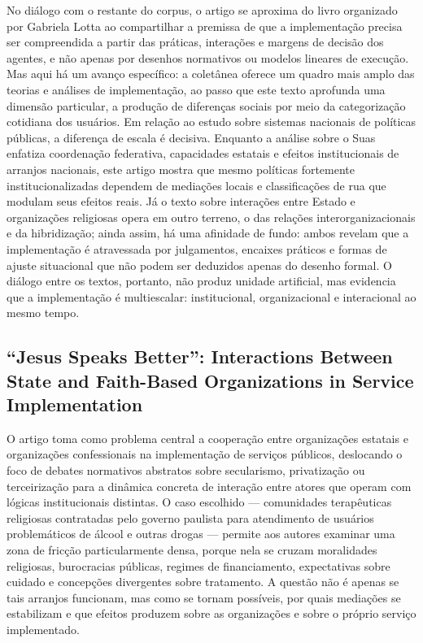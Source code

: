 \documentclass[12pt,a4paper]{article}
\begin{document}
No diálogo com o restante do corpus, o artigo se aproxima do livro organizado por Gabriela Lotta ao compartilhar a premissa de que a implementação precisa ser compreendida a partir das práticas, interações e margens de decisão dos agentes, e não apenas por desenhos normativos ou modelos lineares de execução. Mas aqui há um avanço específico: a coletânea oferece um quadro mais amplo das teorias e análises de implementação, ao passo que este texto aprofunda uma dimensão particular, a produção de diferenças sociais por meio da categorização cotidiana dos usuários. Em relação ao estudo sobre sistemas nacionais de políticas públicas, a diferença de escala é decisiva. Enquanto a análise sobre o Suas enfatiza coordenação federativa, capacidades estatais e efeitos institucionais de arranjos nacionais, este artigo mostra que mesmo políticas fortemente institucionalizadas dependem de mediações locais e classificações de rua que modulam seus efeitos reais. Já o texto sobre interações entre Estado e organizações religiosas opera em outro terreno, o das relações interorganizacionais e da hibridização; ainda assim, há uma afinidade de fundo: ambos revelam que a implementação é atravessada por julgamentos, encaixes práticos e formas de ajuste situacional que não podem ser deduzidos apenas do desenho formal. O diálogo entre os textos, portanto, não produz unidade artificial, mas evidencia que a implementação é multiescalar: institucional, organizacional e interacional ao mesmo tempo. \parencite{lotta2020_categorizando_usuarios,lotta2019_teorias_analises,bichir2020_sistemas_nacionais,lotta2023_jesus_speaks}



\subsection{“Jesus Speaks Better”: Interactions Between State and Faith-Based Organizations in Service Implementation}
\label{sec:orge7ad175}

O artigo toma como problema central a cooperação entre organizações estatais e organizações confessionais na implementação de serviços públicos, deslocando o foco de debates normativos abstratos sobre secularismo, privatização ou terceirização para a dinâmica concreta de interação entre atores que operam com lógicas institucionais distintas. O caso escolhido — comunidades terapêuticas religiosas contratadas pelo governo paulista para atendimento de usuários problemáticos de álcool e outras drogas — permite aos autores examinar uma zona de fricção particularmente densa, porque nela se cruzam moralidades religiosas, burocracias públicas, regimes de financiamento, expectativas sobre cuidado e concepções divergentes sobre tratamento. A questão não é apenas se tais arranjos funcionam, mas como se tornam possíveis, por quais mediações se estabilizam e que efeitos produzem sobre as organizações e sobre o próprio serviço implementado.\parencite{lotta2023_jesus_speaks}
\end{document}
